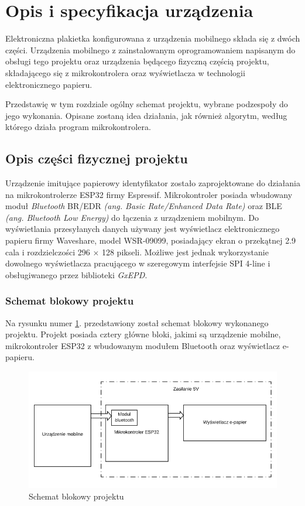 \documentclass[a4paper,12pt, twoside]{article}
\begin{document}
    	\section{Opis i specyfikacja urządzenia}
    	Elektroniczna plakietka konfigurowana z urządzenia mobilnego składa się z dwóch części. Urządzenia mobilnego z zainstalowanym oprogramowaniem napisanym do obsługi tego projektu oraz urządzenia będącego fizyczną częścią projektu, składającego się z mikrokontrolera oraz wyświetlacza w technologii elektronicznego papieru.
    
        Przedstawię w tym rozdziale ogólny schemat projektu, wybrane podzespoły do jego wykonania. Opisane zostaną idea działania, jak również algorytm, według którego działa program mikrokontrolera.
        
        \subsection{Opis części fizycznej projektu}
        Urządzenie imitujące papierowy identyfikator zostało zaprojektowane do działania na mikrokontrolerze ESP32 firmy Espressif. Mikrokontroler posiada wbudowany moduł \textit{Bluetooth} BR/EDR \textit{(ang. Basic Rate/Enhanced Data Rate)}\cite{edr} oraz BLE \textit{(ang. Bluetooth Low Energy)}\cite{ble} do łączenia z urządzeniem mobilnym. Do wyświetlania przesyłanych danych używany jest wyświetlacz elektronicznego papieru firmy Waveshare, model WSR-09099, posiadający ekran o przekątnej 2.9 cala i rozdzielczości 296 × 128 pikseli. Możliwe jest jednak wykorzystanie dowolnego wyświetlacza 
        pracującego w szeregowym interfejsie SPI 4-line i obsługiwanego przez biblioteki \textit{GxEPD}\cite{gxepd}.
        
        \subsubsection{Schemat blokowy projektu}
        Na rysunku numer \ref{fig:block}. przedstawiony został schemat blokowy wykonanego projektu. Projekt posiada cztery główne bloki, jakimi są urządzenie mobilne, mikrokontroler ESP32 z wbudowanym modułem Bluetooth oraz wyświetlacz e-papieru.
        \begin{figure}[H]
    	        \centering
    			\includegraphics[width=13cm]{images/rys_7schemat_blokowy.png}
    			\caption{Schemat blokowy projektu}
                \label{fig:block}
    	\end{figure}
    	
\end{document}

